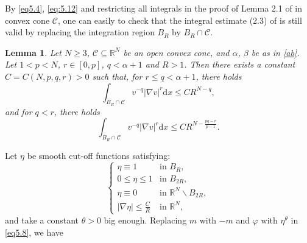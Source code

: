 \documentclass[12pt]{amsart}
\newtheorem{lem}[thm]{Lemma}
\theoremstyle{definition}
\theoremstyle{remark}
\theoremstyle{conclusion}
\theoremstyle{conjecture}
\numberwithin{equation}{section}
\begin{document}
By \eqref{eq5.4}, \eqref{eq:5.12} and restricting all integrals in the proof of Lemma 2.1 of \cite{Ve1} in convex cone $\mathcal{C}$, one can easily to check that the integral estimate (2.3) of \cite{Ve1} is still valid by replacing the integration region $B_R$ by $B_R\cap\mathcal{C}$.
\begin{lem}\label{lem5.5}
Let $N\geq3$, $\mathcal{C}\subseteq\mathbb{R}^{N}$ be an open convex cone, and $\alpha$, $\beta$ be as in \eqref{ab}. Let $1<p<N$, $r\in[0,p]$, $q<\alpha+1$ and $R>1$. Then there exists a constant $C=C(N,p,q,r)>0$ such that, for $r \leq q<\alpha+1$, there holds
\begin{equation*}\label{eq5.13}
\int_{B_R\cap\mathcal{C}}v^{-q }|\nabla v|^r\mathrm{d}x\leq CR^{N-q },
\end{equation*}
and for $q<r$, there holds
\begin{equation*}\label{eq5.14}
\int_{B_R\cap\mathcal{C}}v^{-q }|\nabla v|^r\mathrm{d}x \leq CR^{N-\frac{pq-r}{p-1} }.
\end{equation*}
\end{lem}


\medskip
  Let $\eta$ be smooth cut-off functions satisfying:
\begin{equation}\label{eq5.15}
\begin{cases}
                          \eta\equiv 1  &\text{in} \,\,B_R,\\
                        0\leq\eta\leq1  &\text{in} \,\,B_{2R},\\
                          \eta\equiv 0  &\text{in} \,\,\mathbb{R}^N\backslash B_{2R},\\
     |\nabla \eta|\leq \frac{C}{R}  &\text{in} \,\,\mathbb{R}^N,
\end{cases}
\end{equation}
and take a constant $\theta>0$ big enough.
Replacing  $m$ with  $-m$ and $\varphi$ with $\eta^\theta$ in \eqref{eq5.8}, we have
\end{document}
